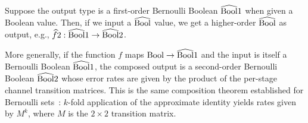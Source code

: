 \documentclass[../main.tex]{subfiles}
\begin{document}
Suppose the output type is a first-order Bernoulli Boolean $\widehat{\mathrm{Bool}}{1}$ when given a Boolean value.
Then, if we input a $\widehat{\mathrm{Bool}}$ value, we get a higher-order $\widehat{\mathrm{Bool}}$ as output, e.g., $\widehat{f}{2} : \widehat{\mathrm{Bool}}{1} \to \widehat{\mathrm{Bool}}{2}$.

More generally, if the function $f$ maps $\mathrm{Bool} \to \widehat{\mathrm{Bool}}{1}$ and the input is itself a Bernoulli Boolean $\widehat{\mathrm{Bool}}{1}$, the composed output is a second-order Bernoulli Boolean $\widehat{\mathrm{Bool}}{2}$ whose error rates are given by the product of the per-stage channel transition matrices.
This is the same composition theorem established for Bernoulli sets~\cite{bernoulliSets,bernoulliComposition}: $k$-fold application of the approximate identity yields rates given by $M^k$, where $M$ is the $2 \times 2$ transition matrix.
\end{document}
